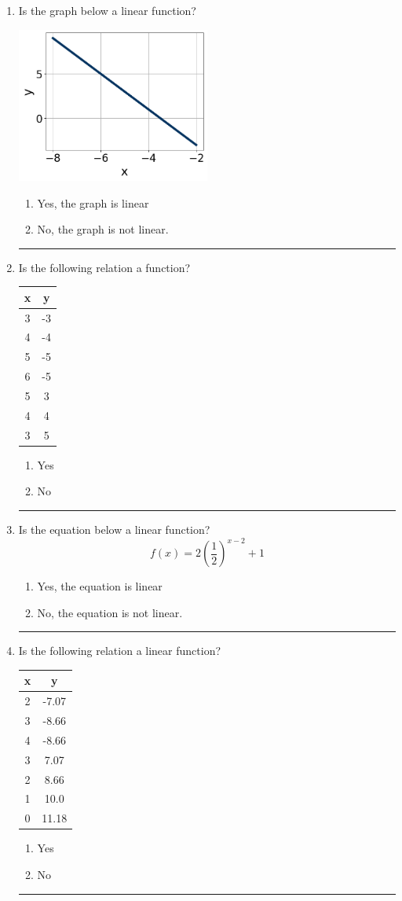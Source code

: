 \documentclass[14pt]{extbook}
\newcommand{\litem}[1]{\item#1\hspace*{-1cm}\rule{\textwidth}{0.4pt}}
\begin{document}
\begin{enumerate}
\litem{
Is the graph below a linear function?
\begin{center}
    \includegraphics[width=0.5\textwidth]{../Figures/MA_8_F_1_2_graphE.png}
\end{center}
\begin{enumerate}[label=\Alph*.]
\item Yes, the graph is linear
\item No, the graph is not linear.

\end{enumerate} }
\litem{
Is the following relation a function?

\begin{tabular}{c|c}
x &y\tabularnewline \hline
3 &-3\tabularnewline \hline
4 &-4\tabularnewline \hline
5 &-5\tabularnewline \hline
6 &-5\tabularnewline \hline
5 &3\tabularnewline \hline
4 &4\tabularnewline \hline
3 &5\end{tabular}\begin{enumerate}[label=\Alph*.]
\item Yes
\item No

\end{enumerate} }
\litem{
Is the equation below a linear function?\[ f(x) = 2 \left( \dfrac{1}{2} \right)^{x -2}+1 \]\begin{enumerate}[label=\Alph*.]
\item Yes, the equation is linear
\item No, the equation is not linear.

\end{enumerate} }
\litem{
Is the following relation a linear function?

\begin{tabular}{c|c}
x &y\tabularnewline \hline
2 &-7.07\tabularnewline \hline
3 &-8.66\tabularnewline \hline
4 &-8.66\tabularnewline \hline
3 &7.07\tabularnewline \hline
2 &8.66\tabularnewline \hline
1 &10.0\tabularnewline \hline
0 &11.18\end{tabular}\begin{enumerate}[label=\Alph*.]
\item Yes
\item No

\end{enumerate} }
\end{enumerate}
\end{document}
